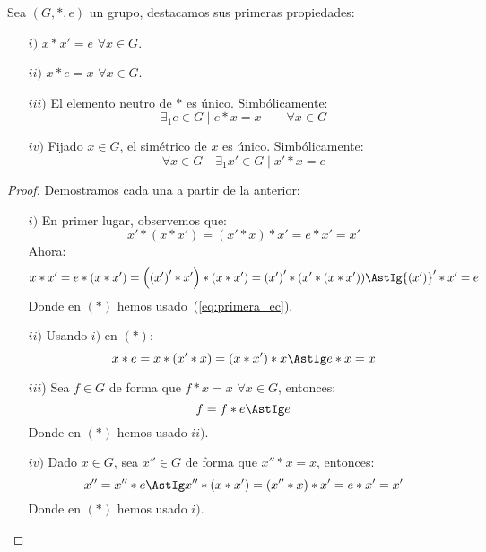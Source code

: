 \begin{prop}
    Sea $(G,\ast,e)$ un grupo, destacamos sus primeras propiedades:
    \begin{enumerate}
        \item[$i)$] $x\ast x' = e$ $\forall x\in G$.
        \item[$ii)$] $x\ast e = x$ $\forall x\in G$.
        \item[$iii)$] El elemento neutro de $\ast$ es único. Simbólicamente:
            \begin{equation*}
                \exists_1 e\in G \mid e\ast x = x \qquad \forall x\in G
            \end{equation*}
        \item[$iv)$] Fijado $x\in G$, el simétrico de $x$ es único. Simbólicamente:
            \begin{equation*}
                \forall x\in G \quad \exists_1 x' \in G \mid x' \ast x = e
            \end{equation*}
    \end{enumerate}
    \begin{proof}
        Demostramos cada una a partir de la anterior:
        \begin{enumerate}
            \item[$i)$] En primer lugar, observemos que:
                \begin{equation}\label{eq:primera_ec}
                    x'\ast (x\ast x') = (x'\ast x) \ast x' = e \ast x' = x'
                \end{equation}
                Ahora:
                \begin{equation*}
                    x\ast x' = e\ast (x \ast x') = \left({(x')}'\ast x'\right) \ast (x\ast x') = {(x')}' \ast (x'\ast (x\ast x')) \AstIg {(x')}' \ast x' = e
                \end{equation*}
                Donde en $(\ast)$ hemos usado~(\ref{eq:primera_ec}).
            \item[$ii)$] Usando $i)$ en $(\ast)$:
                \begin{equation*}
                    x\ast e = x\ast (x' \ast x) = (x \ast x') \ast x \AstIg e \ast x = x
                \end{equation*}
            \item[$iii$)] Sea $f\in G$ de forma que $f\ast x = x$ $\forall x\in G$, entonces:
                \begin{equation*}
                    f = f \ast e \AstIg e
                \end{equation*}
                Donde en $(\ast)$ hemos usado $ii)$.
            \item[$iv)$] Dado $x\in G$, sea $x'' \in G$ de forma que $x'' \ast x = x$, entonces:
                \begin{equation*}
                    x '' = x'' \ast e \AstIg x '' \ast (x \ast x') = (x '' \ast x) \ast x' = e \ast x' = x'
                \end{equation*}
                Donde en $(\ast)$ hemos usado $i)$.
        \end{enumerate}
    \end{proof}
\end{prop}

